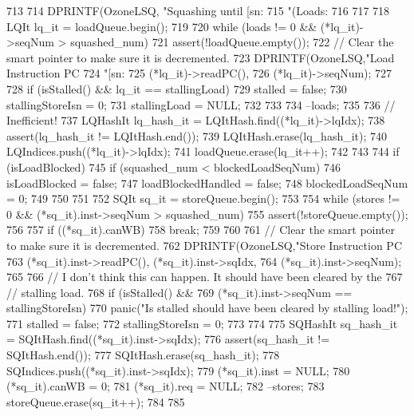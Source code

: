 \begin{DoxyCode}
713 {
714     DPRINTF(OzoneLSQ, "Squashing until [sn:%
715             "(Loads:%
716 
717 
718     LQIt lq_it = loadQueue.begin();
719 
720     while (loads != 0 && (*lq_it)->seqNum > squashed_num) {
721         assert(!loadQueue.empty());
722         // Clear the smart pointer to make sure it is decremented.
723         DPRINTF(OzoneLSQ,"Load Instruction PC %
724                 "[sn:%
725                 (*lq_it)->readPC(),
726                 (*lq_it)->seqNum);
727 
728         if (isStalled() && lq_it == stallingLoad) {
729             stalled = false;
730             stallingStoreIsn = 0;
731             stallingLoad = NULL;
732         }
733 
734         --loads;
735 
736         // Inefficient!
737         LQHashIt lq_hash_it = LQItHash.find((*lq_it)->lqIdx);
738         assert(lq_hash_it != LQItHash.end());
739         LQItHash.erase(lq_hash_it);
740         LQIndices.push((*lq_it)->lqIdx);
741         loadQueue.erase(lq_it++);
742     }
743 
744     if (isLoadBlocked) {
745         if (squashed_num < blockedLoadSeqNum) {
746             isLoadBlocked = false;
747             loadBlockedHandled = false;
748             blockedLoadSeqNum = 0;
749         }
750     }
751 
752     SQIt sq_it = storeQueue.begin();
753 
754     while (stores != 0 && (*sq_it).inst->seqNum > squashed_num) {
755         assert(!storeQueue.empty());
756 
757         if ((*sq_it).canWB) {
758             break;
759         }
760 
761         // Clear the smart pointer to make sure it is decremented.
762         DPRINTF(OzoneLSQ,"Store Instruction PC %
763                 (*sq_it).inst->readPC(), (*sq_it).inst->sqIdx,
764                 (*sq_it).inst->seqNum);
765 
766         // I don't think this can happen.  It should have been cleared by the
767         // stalling load.
768         if (isStalled() &&
769             (*sq_it).inst->seqNum == stallingStoreIsn) {
770             panic("Is stalled should have been cleared by stalling load!\n");
771             stalled = false;
772             stallingStoreIsn = 0;
773         }
774 
775         SQHashIt sq_hash_it = SQItHash.find((*sq_it).inst->sqIdx);
776         assert(sq_hash_it != SQItHash.end());
777         SQItHash.erase(sq_hash_it);
778         SQIndices.push((*sq_it).inst->sqIdx);
779         (*sq_it).inst = NULL;
780         (*sq_it).canWB = 0;
781         (*sq_it).req = NULL;
782         --stores;
783         storeQueue.erase(sq_it++);
784     }
785 }
\end{DoxyCode}
